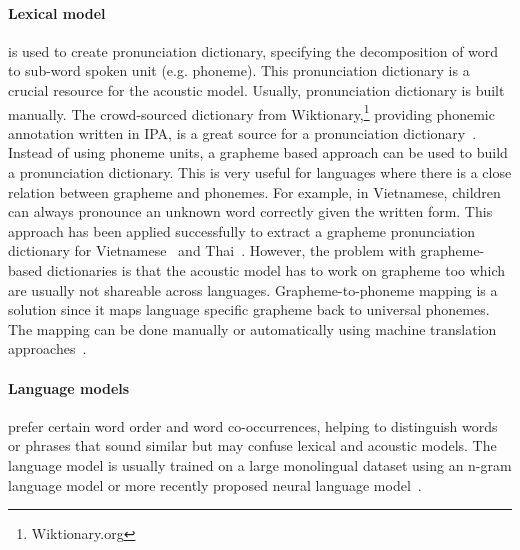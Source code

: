 \documentclass[12pt,twoside,final,hidelinks]{ltthesis}
\theoremstyle{definition}
\begin{document}
\paragraph{Lexical model} is used to create pronunciation dictionary, specifying the decomposition of word to sub-word spoken unit (e.g. phoneme). This pronunciation 
dictionary is a crucial resource for the acoustic model. Usually, pronunciation dictionary is built manually. The crowd-sourced dictionary from 
Wiktionary,\footnote{Wiktionary.org} providing phonemic annotation written in IPA, is a great source for a pronunciation dictionary~\cite{Schlippe2014101}. Instead of 
using phoneme units, a grapheme based approach can be used to build a pronunciation dictionary. This is very useful for languages where there is a close relation between 
grapheme and phonemes. For example, in Vietnamese, children can always pronounce an unknown word correctly given the written form. This approach has been applied 
successfully to extract a grapheme pronunciation dictionary for Vietnamese~\cite{Le2009Vn} and Thai~\cite{Stker2008IntegratingTG}. However, the problem with grapheme-based dictionaries is that the acoustic model has to work on grapheme too which are usually not shareable across languages. Grapheme-to-phoneme mapping is a solution since it maps language specific 
grapheme back to universal phonemes. The mapping can be done manually or automatically using machine translation approaches~\cite{Karanasou:2010:CSM,Cucu2012}. 

\paragraph{Language models} prefer certain word order and word co-occurrences, helping to distinguish words or phrases that sound similar but may confuse lexical and acoustic models. The language model is usually trained on a large monolingual dataset using an n-gram language model or more recently proposed neural language model~\cite{Collobert:2008,mikolov-yih-zweig:2013:NAACL-HLT,Turian:2010:WRS:1858681.1858721,Huang:2012:IWR:2390524.2390645,pennington2014glove}. 
\end{document}
